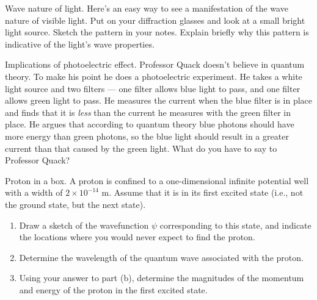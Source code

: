 \begin{aproblem}{Wave nature of light.}  
  Here's an easy way to see a manifestation of the wave nature of
  visible light.  Put on your diffraction glasses and look at a small
  bright light source.  Sketch the pattern in your notes.  Explain
  briefly why this pattern is indicative of the light's wave
  properties.
\end{aproblem}

\addtocounter{prob}{3}

\begin{aproblem}{Implications of photoelectric effect.} 
  Professor Quack doesn't believe in quantum theory.  To make his
  point he does a photoelectric experiment.  He takes a white light
  source and two filters --- one filter allows blue light to pass, and
  one filter allows green light to pass.  He measures the current when
  the blue filter is in place and finds that it is {\em less} than the
  current he measures with the green filter in place.  He argues that
  according to quantum theory blue photons should have more energy
  than green photons, so the blue light should result in a greater
  current than that caused by the green light.  What do you have to
  say to Professor Quack?
\end{aproblem}


\addtocounter{prob}{4}

\begin{aproblem}{Proton in a box.} 
  A proton is confined to a one-dimensional infinite potential well
  with a width of $2 \times 10^{-14}$ m.  Assume that it is in its
  first excited state (i.e., not the ground state, but the next
  state).
  \begin{enumerate}
  \item Draw a sketch of the wavefunction $\psi$ corresponding to this
    state, and indicate the locations where you would never expect to
    find the proton.
  \item Determine the wavelength of the quantum wave associated with
    the proton.
  \item Using your answer to part (b), determine the magnitudes of the
    momentum and energy of the proton in the first excited state.
  \end{enumerate}
  \label{prob:proton_in_box}
\end{aproblem}


